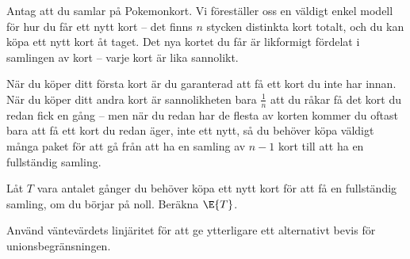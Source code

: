 \documentclass[nobib]{tufte-handout}
\begin{document}
\begin{xca}
    Antag att du samlar på Pokemonkort. Vi föreställer oss en väldigt enkel modell för hur du får ett nytt kort -- det finns $n$ stycken distinkta kort totalt, och du kan köpa ett nytt kort åt taget. Det nya kortet du får är likformigt fördelat i samlingen av kort -- varje kort är lika sannolikt.

    När du köper ditt första kort är du garanterad att få ett kort du inte har innan. När du köper ditt andra kort är sannolikheten bara $\frac{1}{n}$ att du råkar få det kort du redan fick en gång -- men när du redan har de flesta av korten kommer du oftast bara att få ett kort du redan äger, inte ett nytt, så du behöver köpa väldigt många paket för att gå från att ha en samling av $n-1$ kort till att ha en fullständig samling.

    Låt $T$ vara antalet gånger du behöver köpa ett nytt kort för att få en fullständig samling, om du börjar på noll. Beräkna $\E{T}$.
\end{xca}

\begin{xca}
    Använd väntevärdets linjäritet för att ge ytterligare ett alternativt bevis för unionsbegränsningen.
\end{xca}

%
%
\end{document}
